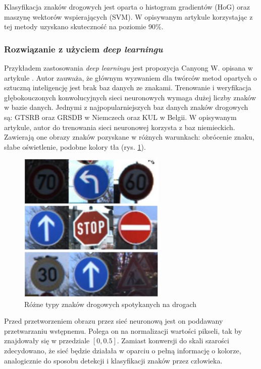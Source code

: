 Klasyfikacja znaków drogowych jest oparta o histogram gradientów (HoG) oraz maszynę wektorów wspierających (SVM). W opisywanym artykule korzystając z tej metody uzyskano skuteczność na poziomie 90\%.

\subsubsection{Rozwiązanie z użyciem \textit{deep learningu}}

Przykładem zastosowania \textit{deep learningu} jest propozycja Canyong W. opisana w artykule \cite{T8}. 
Autor zauważa, że głównym wyzwaniem dla twórców metod opartych o sztuczną inteligencję jest brak baz danych ze znakami. 
Trenowanie i weryfikacja głębokouczonych konwolucyjnych sieci neuronowych wymaga dużej liczby znaków w bazie danych.
Jednymi z najpopularniejszych baz danych znaków drogowych są: GTSRB oraz GRSDB w Niemczech oraz KUL w Belgii. 
W opisywanym artykule, autor do trenowania sieci neuronowej korzysta z baz niemieckich. 
Zawierają one obrazy znaków pozyskane w różnych warunkach: obrócenie znaku, słabe oświetlenie, podobne kolory tła (rys. \ref{fig:sign_detection3_cnn_input}). 

\begin{figure}
  \centering
  \includegraphics[width=7cm]{img/sign_detection3_cnn_input.png}
  \caption{Różne typy znaków drogowych spotykanych na drogach\cite{T8}}
  \label{fig:sign_detection3_cnn_input}
\end{figure}

Przed przetworzeniem obrazu przez sieć neuronową jest on poddawany przetwarzaniu wstępnemu. Polega on na normalizacji wartości pikseli, tak by znajdowały się w przedziale $[0, 0.5]$. 
Zamiast konwersji do skali szarości zdecydowano, że sieć będzie działała w oparciu o pełną informację o kolorze, analogicznie do sposobu detekcji i klasyfikacji znaków przez człowieka.

